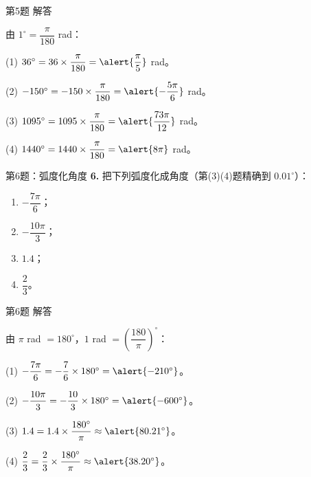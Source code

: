 \documentclass[10pt,aspectratio=169,serif]{beamer}
\begin{document}
\begin{frame}[t]{第5题 解答}
\begin{tcolorbox}[colback=orange!10,colframe=orange,title=\textbf{解}]
由 $1^\circ=\dfrac{\pi}{180}$ rad：

(1) $36^\circ = 36\times\dfrac{\pi}{180} = \alert{\dfrac{\pi}{5}}$ rad。

(2) $-150^\circ = -150\times\dfrac{\pi}{180} = \alert{-\dfrac{5\pi}{6}}$ rad。

(3) $1095^\circ = 1095\times\dfrac{\pi}{180} = \alert{\dfrac{73\pi}{12}}$ rad。

(4) $1440^\circ = 1440\times\dfrac{\pi}{180} = \alert{8\pi}$ rad。
\end{tcolorbox}
\end{frame}

\begin{frame}[t]{第6题：弧度化角度}
\textbf{6.} 把下列弧度化成角度（第(3)(4)题精确到 $0.01^\circ$）：
\begin{enumerate}
  \item $-\dfrac{7\pi}{6}$；
  \item $-\dfrac{10\pi}{3}$；
  \item $1.4$；
  \item $\dfrac{2}{3}$。
\end{enumerate}
\end{frame}

\begin{frame}[t]{第6题 解答}
\begin{tcolorbox}[colback=orange!10,colframe=orange,title=\textbf{解}]
由 $\pi$ rad $=180^\circ$，$1$ rad $=\left(\dfrac{180}{\pi}\right)^\circ$：

(1) $-\dfrac{7\pi}{6} = -\dfrac{7}{6}\times 180^\circ = \alert{-210^\circ}$。

(2) $-\dfrac{10\pi}{3} = -\dfrac{10}{3}\times 180^\circ = \alert{-600^\circ}$。

(3) $1.4 = 1.4\times\dfrac{180^\circ}{\pi} \approx \alert{80.21^\circ}$。

(4) $\dfrac{2}{3} = \dfrac{2}{3}\times\dfrac{180^\circ}{\pi} \approx \alert{38.20^\circ}$。
\end{tcolorbox}
\end{frame}
\end{document}
